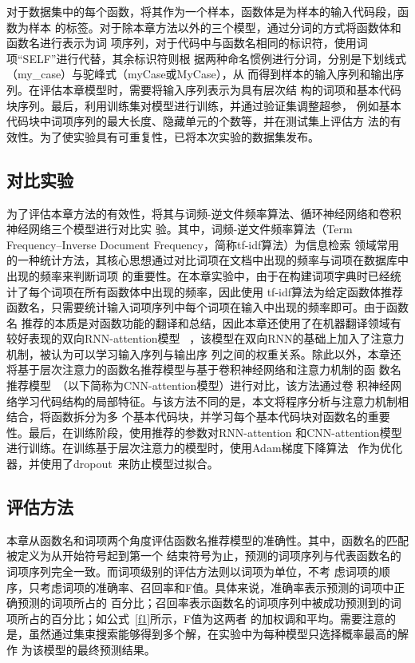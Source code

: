 对于数据集中的每个函数，将其作为一个样本，函数体是为样本的输入代码段，函数为样本
的标签。对于除本章方法以外的三个模型，通过分词的方式将函数体和函数名进行表示为词
项序列，对于代码中与函数名相同的标识符，使用词项``SELF''进行代替，其余标识符则根
据两种命名惯例进行分词，分别是下划线式（my\_case）与驼峰式（myCase或MyCase），从
而得到样本的输入序列和输出序列。在评估本章模型时，需要将输入序列表示为具有层次结
构的词项和基本代码块序列。最后，利用训练集对模型进行训练，并通过验证集调整超参，
例如基本代码块中词项序列的最大长度、隐藏单元的个数等，并在测试集上评估方
法的有效性。为了使实验具有可重复性，已将本次实验的数据集发布。

\subsection{对比实验}
为了评估本章方法的有效性，将其与词频-逆文件频率算法、循环神经网络和卷积神经网络三个模型进行对比实
验。其中，词频-逆文件频率算法（Term Frequency–Inverse Document Frequency，简称tf-idf算法）为信息检索
领域常用的一种统计方法，其核心思想通过对比词项在文档中出现的频率与词项在数据库中出现的频率来判断词项
的重要性。在本章实验中，由于在构建词项字典时已经统计了每个词项在所有函数体中出现的频率，因此使用
tf-idf算法为给定函数体推荐函数名，只需要统计输入词项序列中每个词项在输入中出现的频率即可。由于函数名
推荐的本质是对函数功能的翻译和总结，因此本章还使用了在机器翻译领域有较好表现的双向RNN-attention模型
~\cite{bahdanau2015neural}，该模型在双向RNN的基础上加入了注意力机制，被认为可以学习输入序列与输出序
列之间的权重关系。除此以外，本章还将基于层次注意力的函数名推荐模型与基于卷积神经网络和注意力机制的函
数名推荐模型~\cite{allamanis2016convolutional}（以下简称为CNN-attention模型）进行对比，该方法通过卷
积神经网络学习代码结构的局部特征。与该方法不同的是，本文将程序分析与注意力机制相结合，将函数拆分为多
个基本代码块，并学习每个基本代码块对函数名的重要性。最后，在训练阶段，使用推荐的参数对RNN-attention
和CNN-attention模型进行训练。在训练基于层次注意力的模型时，使用Adam梯度下降算法
~\cite{kingma2014adam}作为优化器，并使用了dropout~\cite{srivastava2014dropout}来防止模型过拟合。

\subsection{评估方法}
本章从函数名和词项两个角度评估函数名推荐模型的准确性。其中，函数名的匹配被定义为从开始符号起到第一个
结束符号为止，预测的词项序列与代表函数名的词项序列完全一致。而词项级别的评估方法则以词项为单位，不考
虑词项的顺序，只考虑词项的准确率、召回率和F值。具体来说，准确率表示预测的词项中正确预测的词项所占的
百分比；召回率表示函数名的词项序列中被成功预测到的词项所占的百分比；如公式~\ref{f1}所示，F值为这两者
的加权调和平均。需要注意的是，虽然通过集束搜索能够得到多个解，在实验中为每种模型只选择概率最高的解作
为该模型的最终预测结果。

